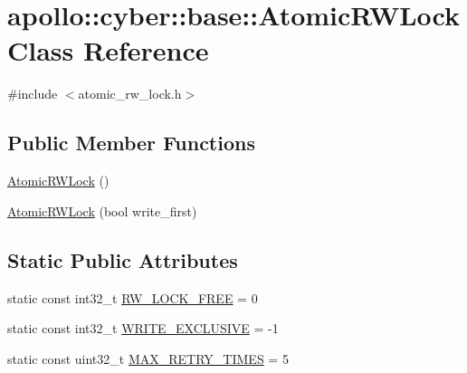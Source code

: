 \hypertarget{classapollo_1_1cyber_1_1base_1_1AtomicRWLock}{\section{apollo\-:\-:cyber\-:\-:base\-:\-:Atomic\-R\-W\-Lock Class Reference}
\label{classapollo_1_1cyber_1_1base_1_1AtomicRWLock}
}


{\ttfamily \#include $<$atomic\-\_\-rw\-\_\-lock.\-h$>$}

\subsection*{Public Member Functions}
\begin{DoxyCompactItemize}
\item 
\hyperlink{classapollo_1_1cyber_1_1base_1_1AtomicRWLock_ac95a9bd44dde5cb5478fb47f2e884ea2}{Atomic\-R\-W\-Lock} ()
\item 
\hyperlink{classapollo_1_1cyber_1_1base_1_1AtomicRWLock_adba8c36fa57f40852590ba1390f03427}{Atomic\-R\-W\-Lock} (bool write\-\_\-first)
\end{DoxyCompactItemize}
\subsection*{Static Public Attributes}
\begin{DoxyCompactItemize}
\item 
static const int32\-\_\-t \hyperlink{classapollo_1_1cyber_1_1base_1_1AtomicRWLock_a85da033794c4e6cf82e6a8e89266ee40}{R\-W\-\_\-\-L\-O\-C\-K\-\_\-\-F\-R\-E\-E} = 0
\item 
static const int32\-\_\-t \hyperlink{classapollo_1_1cyber_1_1base_1_1AtomicRWLock_add34af0709bcc95f70afbce7a4b6c7e3}{W\-R\-I\-T\-E\-\_\-\-E\-X\-C\-L\-U\-S\-I\-V\-E} = -\/1
\item 
static const uint32\-\_\-t \hyperlink{classapollo_1_1cyber_1_1base_1_1AtomicRWLock_a16fe6c0b37ad30c852de92297798ad43}{M\-A\-X\-\_\-\-R\-E\-T\-R\-Y\-\_\-\-T\-I\-M\-E\-S} = 5
\end{DoxyCompactItemize}
